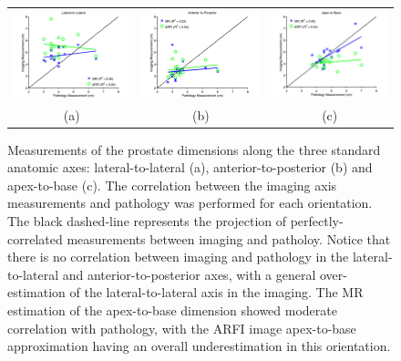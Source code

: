 \begin{figure}[htb!]
\centering
\begin{tabular}{ccc}
\includegraphics[width=0.3\linewidth]{figs/Lateral-to-Lateral} &
\includegraphics[width=0.3\linewidth]{figs/Anterior-to-Posterior} &
\includegraphics[width=0.3\linewidth]{figs/Apex-to-Base} \\
(a) & (b) & (c) \\
\end{tabular}
\caption{Measurements of the prostate dimensions along the three standard
anatomic axes: lateral-to-lateral (a), anterior-to-posterior (b) and
apex-to-base (c).  The correlation between the imaging axis measurements and
pathology was performed for each orientation.  The black dashed-line represents
the projection of perfectly-correlated measurements between imaging and
patholoy.  Notice that there is no correlation between imaging and pathology in
the lateral-to-lateral and anterior-to-posterior axes, with a general
over-estimation of the lateral-to-lateral axis in the imaging.  The MR
estimation of the apex-to-base dimension showed moderate correlation with
pathology, with the ARFI image apex-to-base approximation having an overall
underestimation in this orientation.}
\label{fig:mr_arfi_path_axes} 
\end{figure}
